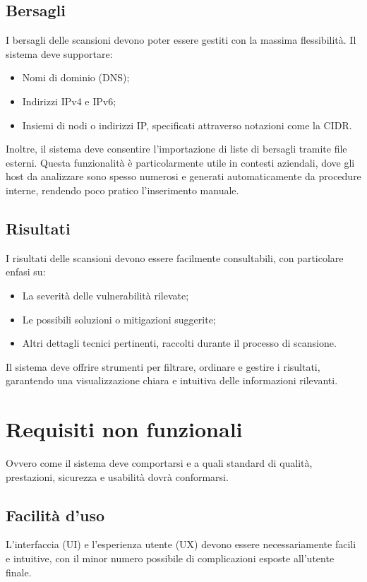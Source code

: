 \subsection{Bersagli}
I bersagli delle scansioni devono poter essere gestiti con la massima flessibilità. Il sistema deve supportare:
\begin{itemize}
    \item Nomi di dominio (DNS);
    \item Indirizzi IPv4 e IPv6;
    \item Insiemi di nodi o indirizzi IP, specificati attraverso notazioni come la CIDR.
\end{itemize}

Inoltre, il sistema deve consentire l'importazione di liste di bersagli tramite file esterni. Questa funzionalità è particolarmente utile in contesti aziendali, dove gli host da analizzare sono spesso numerosi e generati automaticamente da procedure interne, rendendo poco pratico l'inserimento manuale.

\subsection{Risultati}
I risultati delle scansioni devono essere facilmente consultabili, con particolare enfasi su:
\begin{itemize}
    \item La severità delle vulnerabilità rilevate;
    \item Le possibili soluzioni o mitigazioni suggerite;
    \item Altri dettagli tecnici pertinenti, raccolti durante il processo di scansione.
\end{itemize}

Il sistema deve offrire strumenti per filtrare, ordinare e gestire i risultati, garantendo una visualizzazione chiara e intuitiva delle informazioni rilevanti.

\section{Requisiti non funzionali}
Ovvero come il sistema deve comportarsi e a quali standard di qualità, prestazioni, sicurezza e usabilità dovrà conformarsi.

\subsection{Facilità d'uso}
L'interfaccia (UI) e l'esperienza utente (UX) devono essere necessariamente facili e intuitive, con il minor numero possibile di complicazioni esposte all'utente finale.

